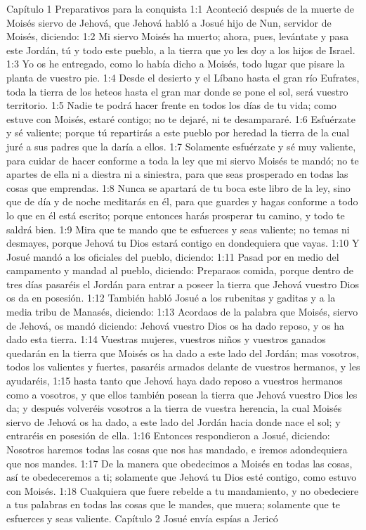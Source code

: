 Capítulo 1 
Preparativos para la conquista  
1:1 Aconteció después de la muerte de Moisés siervo de Jehová, que Jehová habló a Josué hijo de Nun, servidor de Moisés, diciendo:  
1:2 Mi siervo Moisés ha muerto; ahora, pues, levántate y pasa este Jordán, tú y todo este pueblo, a la tierra que yo les doy a los hijos de Israel.  
1:3 Yo os he entregado, como lo había dicho a Moisés, todo lugar que pisare la planta de vuestro pie.  
1:4 Desde el desierto y el Líbano hasta el gran río Eufrates, toda la tierra de los heteos hasta el gran mar donde se pone el sol, será vuestro territorio.  
1:5 Nadie te podrá hacer frente en todos los días de tu vida; como estuve con Moisés, estaré contigo; no te dejaré, ni te desampararé.  
1:6 Esfuérzate y sé valiente; porque tú repartirás a este pueblo por heredad la tierra de la cual juré a sus padres que la daría a ellos.  
1:7 Solamente esfuérzate y sé muy valiente, para cuidar de hacer conforme a toda la ley que mi siervo Moisés te mandó; no te apartes de ella ni a diestra ni a siniestra, para que seas prosperado en todas las cosas que emprendas.  
1:8 Nunca se apartará de tu boca este libro de la ley, sino que de día y de noche meditarás en él, para que guardes y hagas conforme a todo lo que en él está escrito; porque entonces harás prosperar tu camino, y todo te saldrá bien.  
1:9 Mira que te mando que te esfuerces y seas valiente; no temas ni desmayes, porque Jehová tu Dios estará contigo en dondequiera que vayas.  
1:10 Y Josué mandó a los oficiales del pueblo, diciendo:  
1:11 Pasad por en medio del campamento y mandad al pueblo, diciendo: Preparaos comida, porque dentro de tres días pasaréis el Jordán para entrar a poseer la tierra que Jehová vuestro Dios os da en posesión.  
1:12 También habló Josué a los rubenitas y gaditas y a la media tribu de Manasés, diciendo:  
1:13 Acordaos de la palabra que Moisés, siervo de Jehová, os mandó diciendo: Jehová vuestro Dios os ha dado reposo, y os ha dado esta tierra.  
1:14 Vuestras mujeres, vuestros niños y vuestros ganados quedarán en la tierra que Moisés os ha dado a este lado del Jordán; mas vosotros, todos los valientes y fuertes, pasaréis armados delante de vuestros hermanos, y les ayudaréis,  
1:15 hasta tanto que Jehová haya dado reposo a vuestros hermanos como a vosotros, y que ellos también posean la tierra que Jehová vuestro Dios les da; y después volveréis vosotros a la tierra de vuestra herencia, la cual Moisés siervo de Jehová os ha dado, a este lado del Jordán hacia donde nace el sol; y entraréis en posesión de ella. 
1:16 Entonces respondieron a Josué, diciendo: Nosotros haremos todas las cosas que nos has mandado, e iremos adondequiera que nos mandes.  
1:17 De la manera que obedecimos a Moisés en todas las cosas, así te obedeceremos a ti; solamente que Jehová tu Dios esté contigo, como estuvo con Moisés.  
1:18 Cualquiera que fuere rebelde a tu mandamiento, y no obedeciere a tus palabras en todas las cosas que le mandes, que muera; solamente que te esfuerces y seas valiente.  
Capítulo 2
Josué envía espías a Jericó  

